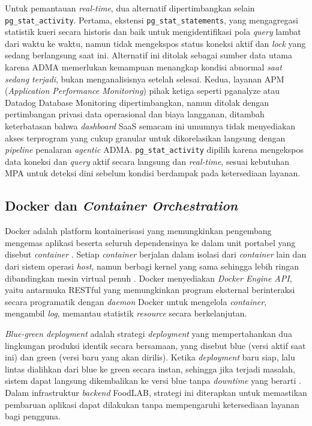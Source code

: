 Untuk pemantauan \textit{real-time}, dua alternatif dipertimbangkan selain \texttt{pg\_stat\_activity}. Pertama, ekstensi \texttt{pg\_stat\_statements}, yang mengagregasi statistik kueri secara historis dan baik untuk mengidentifikasi pola \textit{query} lambat dari waktu ke waktu, namun tidak mengekspos status koneksi aktif dan \textit{lock} yang sedang berlangsung saat ini. Alternatif ini ditolak sebagai sumber data utama karena ADMA memerlukan kemampuan menangkap kondisi abnormal \textit{saat sedang terjadi}, bukan menganalisisnya setelah selesai. Kedua, layanan APM (\textit{Application Performance Monitoring}) pihak ketiga seperti pganalyze atau Datadog Database Monitoring dipertimbangkan, namun ditolak dengan pertimbangan privasi data operasional dan biaya langganan, ditambah keterbatasan bahwa \textit{dashboard} SaaS semacam ini umumnya tidak menyediakan akses terprogram yang cukup granular untuk dikorelasikan langsung dengan \textit{pipeline} penalaran \textit{agentic} ADMA. \texttt{pg\_stat\_activity} dipilih karena mengekspos data koneksi dan \textit{query} aktif secara langsung dan \textit{real-time}, sesuai kebutuhan MPA untuk deteksi dini sebelum kondisi berdampak pada ketersediaan layanan.

\subsection{Docker dan \textit{Container Orchestration}}

Docker adalah platform kontainerisasi yang memungkinkan pengembang mengemas aplikasi beserta seluruh dependensinya ke dalam unit portabel yang disebut \textit{container} \cite{zou2022docker}. Setiap \textit{container} berjalan dalam isolasi dari \textit{container} lain dan dari sistem operasi \textit{host}, namun berbagi kernel yang sama sehingga lebih ringan dibandingkan mesin virtual penuh \cite{zou2022docker}. Docker menyediakan \textit{Docker Engine API}, yaitu antarmuka RESTful yang memungkinkan program eksternal berinteraksi secara programatik dengan \textit{daemon} Docker untuk mengelola \textit{container}, mengambil \textit{log}, memantau statistik \textit{resource} secara berkelanjutan.

\textit{Blue-green deployment} adalah strategi \textit{deployment} yang mempertahankan dua lingkungan produksi identik secara bersamaan, yang disebut blue (versi aktif saat ini) dan green (versi baru yang akan dirilis). Ketika \textit{deployment} baru siap, lalu lintas dialihkan dari blue ke green secara instan, sehingga jika terjadi masalah, sistem dapat langsung dikembalikan ke versi blue tanpa \textit{downtime} yang berarti \cite{ekanayaka2023kubflow}. Dalam infrastruktur \textit{backend} FoodLAB, strategi ini diterapkan untuk memastikan pembaruan aplikasi dapat dilakukan tanpa mempengaruhi ketersediaan layanan bagi pengguna.

